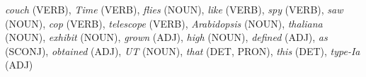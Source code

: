 \emph{couch} (VERB), \emph{Time} (VERB), \emph{flies} (NOUN), \emph{like} (VERB), \emph{spy} (VERB), \emph{saw} (NOUN), \emph{cop} (VERB), \emph{telescope} (VERB), \emph{Arabidopsis} (NOUN), \emph{thaliana} (NOUN), \emph{exhibit} (NOUN), \emph{grown} (ADJ), \emph{high} (NOUN), \emph{defined} (ADJ), \emph{as} (SCONJ), \emph{obtained} (ADJ), \emph{UT} (NOUN), \emph{that} (DET, PRON), \emph{this} (DET), \emph{type-Ia} (ADJ)